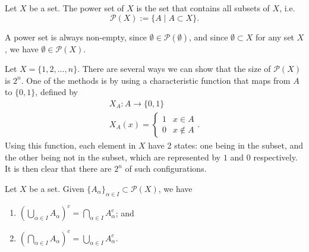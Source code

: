\documentclass[notoc,notitlepage]{tufte-book}
\begin{document}
\begin{defn}\label{defn:power_set}
  Let $X$ be a set. The power set of $X$ is the set that contains all subsets of $X$, i.e.
  \begin{equation*}
    \mathcal{P}(X) := \{ A \mid A \subset X \}.
  \end{equation*}
\end{defn}

\begin{note}
  A power set is always non-empty, since $\emptyset \in \mathcal{P}(\emptyset)$, and since $\emptyset \subset X$ for any set $X$, we have $\emptyset \in \mathcal{P}(X)$.
\end{note}

\begin{eg}
  Let $X = \{1, 2, \ldots, n\}$. There are several ways we can show that the size of $\mathcal{P}(X)$ is $2^n$. One of the methods is by using a characteristic function that maps from $A$ to $\{0, 1\}$, defined by
  \begin{gather*}
    X_A: A \to \{0, 1\} \\
    X_A(x) = \begin{cases}
      1 & x \in A \\
      0 & x \notin A
    \end{cases}.
  \end{gather*}
  Using this function, each element in $X$ have 2 states: one being in the subset, and the other being not in the subset, which are represented by $1$ and $0$ respectively. It is then clear that there are $2^n$ of such configurations.
\end{eg}

\begin{thm}\label{thm:de_morgan_s_laws}
  Let $X$ be a set. Given ${\{A_\alpha\}}_{\alpha \in I} \subset \mathcal{P}(X)$, we have
  \begin{enumerate}
    \item ${\left( \bigcup\limits_{\alpha \in I} A_\alpha \right)}^c = \bigcap\limits_{\alpha \in I} A_\alpha^c$; and
    \item ${\left( \bigcap\limits_{\alpha \in I} A_\alpha \right)}^c = \bigcup\limits_{\alpha \in I} A_\alpha^c$.
  \end{enumerate}
\end{thm}
\end{document}
